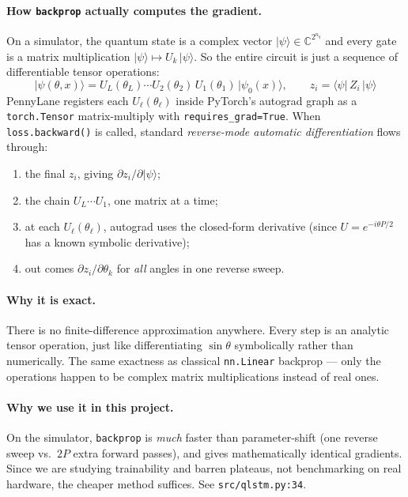 \documentclass[11pt,a4paper]{article}
\begin{document}
\paragraph{How \texttt{backprop} actually computes the gradient.} On a simulator, the quantum state is a complex vector $|\psi\rangle \in \mathbb{C}^{2^{n_q}}$ and every gate is a matrix multiplication $|\psi\rangle \mapsto U_k\,|\psi\rangle$. So the entire circuit is just a sequence of differentiable tensor operations:
\[
  |\psi(\theta, x)\rangle = U_L(\theta_L) \cdots U_2(\theta_2)\,U_1(\theta_1)\,|\psi_0(x)\rangle,
  \qquad
  z_i = \langle\psi|\,Z_i\,|\psi\rangle
\]
PennyLane registers each $U_\ell(\theta_\ell)$ inside PyTorch's autograd graph as a \texttt{torch.Tensor} matrix-multiply with \texttt{requires\_grad=True}. When \texttt{loss.backward()} is called, standard \emph{reverse-mode automatic differentiation} flows through:
\begin{enumerate}
  \item the final $z_i$, giving $\partial z_i / \partial |\psi\rangle$;
  \item the chain $U_L \cdots U_1$, one matrix at a time;
  \item at each $U_\ell(\theta_\ell)$, autograd uses the closed-form derivative (since $U = e^{-i\theta P/2}$ has a known symbolic derivative);
  \item out comes $\partial z_i / \partial \theta_k$ for \emph{all} angles in one reverse sweep.
\end{enumerate}

\paragraph{Why it is exact.} There is no finite-difference approximation anywhere. Every step is an analytic tensor operation, just like differentiating $\sin\theta$ symbolically rather than numerically. The same exactness as classical \texttt{nn.Linear} backprop --- only the operations happen to be complex matrix multiplications instead of real ones.

\paragraph{Why we use it in this project.} On the simulator, \texttt{backprop} is \emph{much} faster than parameter-shift (one reverse sweep vs.\ $2P$ extra forward passes), and gives mathematically identical gradients. Since we are studying trainability and barren plateaus, not benchmarking on real hardware, the cheaper method suffices. See \texttt{src/qlstm.py:34}.
\end{document}
